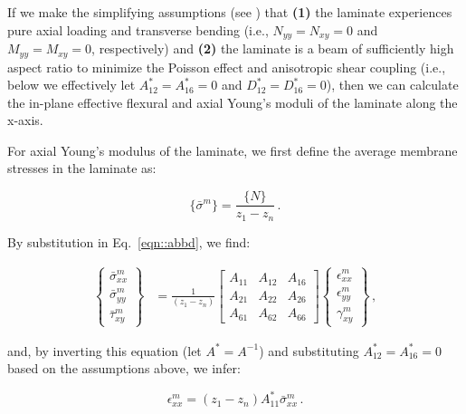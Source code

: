 \documentclass[twocolumn, linenumbers, superscriptaddress, nofootinbib]{revtex4-1}
\begin{document}
				If we make the simplifying assumptions (see \cite{Jones2014, Reddy2004}) that \textbf{(1)} the laminate experiences pure axial loading and transverse bending (i.e., $N_{yy} = N_{xy} = 0$ and $M_{yy} = M_{xy} = 0$, respectively) and \textbf{(2)} the laminate is a beam of sufficiently high aspect ratio to minimize the Poisson effect and anisotropic shear coupling (i.e., below we effectively let $A^*_{12} = A^*_{16} = 0$ and $D^*_{12} = D^*_{16} = 0$), then we can calculate the in-plane effective flexural and axial Young's moduli of the laminate along the x-axis.
				
				For axial Young's modulus of the laminate, we first define the average membrane stresses in the laminate as:
				
				\begin{equation}
					\{\bar{\sigma}^m\} = \frac{\{N\}}{z_1 - z_n}\,.
				\end{equation}
				
				By substitution in Eq.~\ref{eqn::abbd}, we find:
				
				\begin{equation}
					\begin{aligned}
						\begin{Bmatrix}
							\bar{\sigma}^m_{xx} \\
							\bar{\sigma}^m_{yy} \\
							\bar{\tau}^m_{xy}
						\end{Bmatrix}
						& = \frac{1}{(z_1 - z_n)}
						\begin{bmatrix}
							A_{11} & A_{12} & A_{16} \\
							A_{21} & A_{22} & A_{26} \\
							A_{61} & A_{62} & A_{66}
						\end{bmatrix}
						\begin{Bmatrix}
							\epsilon^m_{xx} \\
							\epsilon^m_{yy} \\
							\gamma^m_{xy}
						\end{Bmatrix}\,,
					\end{aligned}
				\end{equation}
				
				and, by inverting this equation (let $A^* = A^{-1}$) and substituting $A^*_{12} = A^*_{16} = 0$ based on the assumptions above, we infer:
				
				\begin{equation}
					\epsilon^m_{xx} = (z_1 - z_n)A^{*}_{11}\bar{\sigma}^m_{xx}\,.
				\end{equation}
				
\end{document}
